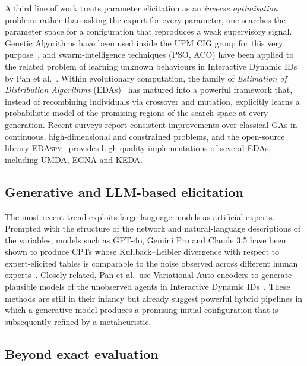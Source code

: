 A third line of work treats parameter elicitation as an
\emph{inverse optimisation} problem: rather than asking the expert
for every parameter, one searches the parameter space for a
configuration that reproduces a weak supervisory signal. Genetic
Algorithms have been used inside the UPM CIG group for this very
purpose~\cite{henriquez2024tfm}, and swarm-intelligence techniques
(PSO, ACO) have been applied to the related problem of learning
unknown behaviours in Interactive Dynamic IDs by Pan et
al.~\cite{pan2025iddids}. Within evolutionary computation, the
family of \emph{Estimation of Distribution Algorithms}
(EDAs)~\cite{larranaga2002eda} has matured into a powerful framework
that, instead of recombining individuals via crossover and mutation,
explicitly learns a probabilistic model of the promising regions of
the search space at every generation. Recent surveys
\cite{larranaga2024edas} report consistent improvements over
classical GAs in continuous, high-dimensional and constrained
problems, and the open-source library
\textsc{EDAspy}~\cite{soloviev2024edaspy} provides
high-quality implementations of several EDAs, including UMDA, EGNA and KEDA.

\subsection{Generative and LLM-based elicitation}

The most recent trend exploits large language models as artificial experts. Prompted with the structure of the network
and natural-language descriptions of the variables, models such as
GPT-4o, Gemini Pro and Claude 3.5 have been shown to produce CPTs
whose Kullback–Leibler divergence with respect to expert-elicited
tables is comparable to the noise observed across different human
experts~\cite{nafar2025llm4bn}. Closely related, Pan et al.~use
Variational Auto-encoders to generate plausible models of the
unobserved agents in Interactive Dynamic IDs~\cite{pan2024vae}.
These methods are still in their infancy but already suggest powerful
hybrid pipelines in which a generative model produces a promising initial
configuration that is subsequently refined by a metaheuristic.

\subsection{Beyond exact evaluation}

